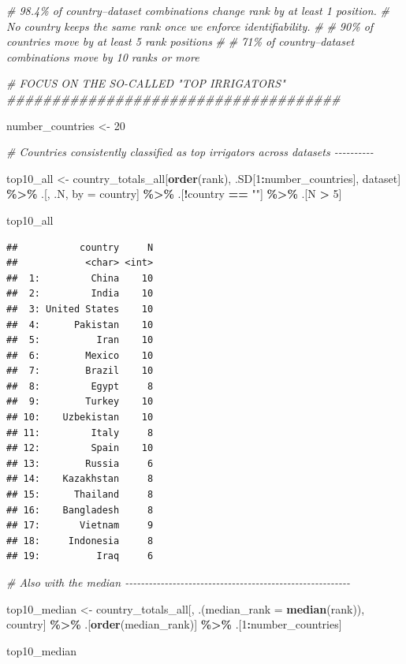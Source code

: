 \documentclass[
  11pt,
]{article}
\newenvironment{Shaded}{\begin{snugshade}}{\end{snugshade}}
\newcommand{\AttributeTok}[1]{\textcolor[rgb]{0.13,0.29,0.53}{#1}}
\newcommand{\CommentTok}[1]{\textcolor[rgb]{0.56,0.35,0.01}{\textit{#1}}}
\newcommand{\DecValTok}[1]{\textcolor[rgb]{0.00,0.00,0.81}{#1}}
\newcommand{\FunctionTok}[1]{\textcolor[rgb]{0.13,0.29,0.53}{\textbf{#1}}}
\newcommand{\NormalTok}[1]{#1}
\newcommand{\OtherTok}[1]{\textcolor[rgb]{0.56,0.35,0.01}{#1}}
\newcommand{\SpecialCharTok}[1]{\textcolor[rgb]{0.81,0.36,0.00}{\textbf{#1}}}
\newcommand{\StringTok}[1]{\textcolor[rgb]{0.31,0.60,0.02}{#1}}
\begin{document}
\begin{Shaded}
\begin{Highlighting}[]
\CommentTok{\# 98.4\% of country–dataset combinations change rank by at least 1 position.}
\CommentTok{\# No country keeps the same rank once we enforce identifiability.}
\CommentTok{\#}
\CommentTok{\# 90\% of countries move by at least 5 rank positions}
\CommentTok{\#}
\CommentTok{\# 71\% of country–dataset combinations move by 10 ranks or more}

\CommentTok{\# FOCUS ON THE SO{-}CALLED "TOP IRRIGATORS" \#\#\#\#\#\#\#\#\#\#\#\#\#\#\#\#\#\#\#\#\#\#\#\#\#\#\#\#\#\#\#\#\#\#\#\#\#}

\NormalTok{number\_countries }\OtherTok{\textless{}{-}} \DecValTok{20}

\CommentTok{\# Countries consistently classified as top irrigators across datasets {-}{-}{-}{-}{-}{-}{-}{-}{-}{-}}

\NormalTok{top10\_all }\OtherTok{\textless{}{-}}\NormalTok{ country\_totals\_all[}\FunctionTok{order}\NormalTok{(rank), .SD[}\DecValTok{1}\SpecialCharTok{:}\NormalTok{number\_countries], dataset] }\SpecialCharTok{\%\textgreater{}\%}
\NormalTok{  .[, .N, by }\OtherTok{=}\NormalTok{ country] }\SpecialCharTok{\%\textgreater{}\%}
\NormalTok{  .[}\SpecialCharTok{!}\NormalTok{country }\SpecialCharTok{==} \StringTok{""}\NormalTok{] }\SpecialCharTok{\%\textgreater{}\%}
\NormalTok{  .[N }\SpecialCharTok{\textgreater{}} \DecValTok{5}\NormalTok{]}

\NormalTok{top10\_all}
\end{Highlighting}
\end{Shaded}

\begin{verbatim}
##           country     N
##            <char> <int>
##  1:         China    10
##  2:         India    10
##  3: United States    10
##  4:      Pakistan    10
##  5:          Iran    10
##  6:        Mexico    10
##  7:        Brazil    10
##  8:         Egypt     8
##  9:        Turkey    10
## 10:    Uzbekistan    10
## 11:         Italy     8
## 12:         Spain    10
## 13:        Russia     6
## 14:    Kazakhstan     8
## 15:      Thailand     8
## 16:    Bangladesh     8
## 17:       Vietnam     9
## 18:     Indonesia     8
## 19:          Iraq     6
\end{verbatim}

\begin{Shaded}
\begin{Highlighting}[]
\CommentTok{\# Also with the median {-}{-}{-}{-}{-}{-}{-}{-}{-}{-}{-}{-}{-}{-}{-}{-}{-}{-}{-}{-}{-}{-}{-}{-}{-}{-}{-}{-}{-}{-}{-}{-}{-}{-}{-}{-}{-}{-}{-}{-}{-}{-}{-}{-}{-}{-}{-}{-}{-}{-}{-}{-}{-}{-}{-}{-}{-}}

\NormalTok{top10\_median }\OtherTok{\textless{}{-}}\NormalTok{ country\_totals\_all[, .(}\AttributeTok{median\_rank =} \FunctionTok{median}\NormalTok{(rank)), country] }\SpecialCharTok{\%\textgreater{}\%}
\NormalTok{  .[}\FunctionTok{order}\NormalTok{(median\_rank)] }\SpecialCharTok{\%\textgreater{}\%}
\NormalTok{  .[}\DecValTok{1}\SpecialCharTok{:}\NormalTok{number\_countries]}

\NormalTok{top10\_median}
\end{Highlighting}
\end{Shaded}
\end{document}
